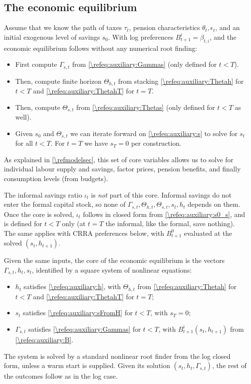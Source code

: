 \subsection{The economic equilibrium}\label{\refsec:EE}

Assume that we know the path of taxes $\tau_t$, pension characteristics $\theta_t, \epsilon_t$, and an initial exogenous level of savings $s_0$. With log preferences $B_{t+1}^i = \beta_{t,i}$, and the economic equilibrium follows without any numerical root finding:
\begin{itemize}
    \item First compute $\Gamma_{s,t}$ from \eqref{\refeq:auxiliary:Gammas} (only defined for $t<T$).
    \item Then, compute finite horizon $\Theta_{h,t}$ from stacking \eqref{\refeq:auxiliary:Thetah} for $t<T$ and \eqref{\refeq:auxiliary:ThetahT} for $t=T$.
    \item Then, compute $\Theta_{s,t}$ from \eqref{\refeq:auxiliary:Thetas} (only defined for $t<T$ as well).
    \item Given $s_0$ and $\Theta_{s,t}$ we can iterate forward on \eqref{\refeq:auxiliary:s} to solve for $s_t$ for all $t<T$. For $t=T$ we have $s_T = 0$ per construction.
\end{itemize}
As explained in \cref{\refmodelsec}, this set of core variables allows us to solve for individual labour supply and savings, factor prices, pension benefits, and finally consumption levels (from budgets).

The informal savings ratio $\iota_t$ is \emph{not} part of this core. Informal savings do not enter the formal capital stock, so none of $\Gamma_{s,t}, \Theta_{h,t}, \Theta_{s,t}, s_t, h_t$ depends on them. Once the core is solved, $\iota_t$ follows in closed form from \eqref{\refeq:auxiliary:s0_s}, and is defined for $t<T$ only (at $t=T$ the informal, like the formal, save nothing). The same applies with CRRA preferences below, with $B_{t+1}^0$ evaluated at the solved $\left(s_t, h_{t+1}\right)$.


Given the same inputs, the core of the economic equilibrium is the vectors $\Gamma_{s,t}, h_t, s_t$, identified by a square system of nonlinear equations:
\begin{itemize}
    \item $h_t$ satisfies \eqref{\refeq:auxiliary:h}, with $\Theta_{h,t}$ from \eqref{\refeq:auxiliary:Thetah} for $t<T$ and \eqref{\refeq:auxiliary:ThetahT} for $t=T$;
    \item $s_t$ satisfies \eqref{\refeq:auxiliary:sFromH} for $t<T$, with $s_T = 0$;
    \item $\Gamma_{s,t}$ satisfies \eqref{\refeq:auxiliary:Gammas} for $t<T$, with $B_{t+1}^i(s_t, h_{t+1})$ from \eqref{\refeq:auxiliary:B}.
\end{itemize}
The system is solved by a standard nonlinear root finder from the log closed form, unless a warm start is supplied. Given its solution $(s_t, h_t, \Gamma_{s,t})$, the rest of the outcomes follow as in the log case.


